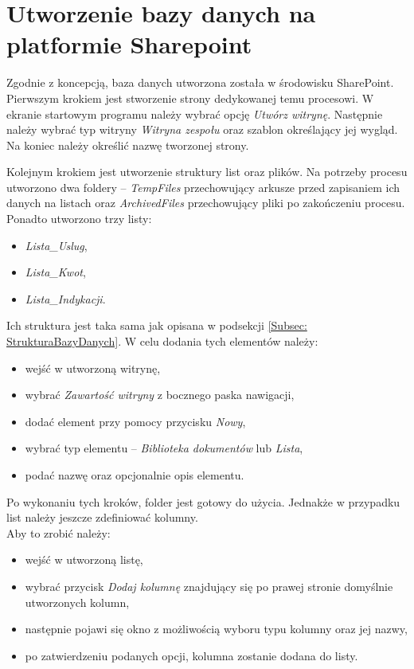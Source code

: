 \section{Utworzenie bazy danych na platformie Sharepoint}

Zgodnie z koncepcją, baza danych utworzona została w środowisku SharePoint.
Pierwszym krokiem jest stworzenie strony dedykowanej temu procesowi. W ekranie startowym programu należy wybrać opcję \emph{Utwórz witrynę}. Następnie należy wybrać typ witryny \emph{Witryna zespołu} oraz szablon określający jej wygląd. Na koniec należy określić nazwę tworzonej strony.

Kolejnym krokiem jest utworzenie struktury list oraz plików. Na potrzeby procesu utworzono dwa foldery -- \emph{TempFiles} przechowujący arkusze przed zapisaniem ich danych na listach oraz \emph{ArchivedFiles} przechowujący pliki po zakończeniu procesu.
Ponadto utworzono trzy listy:
\begin{itemize}
    \item \emph{Lista\_Uslug},
    \item \emph{Lista\_Kwot},
    \item \emph{Lista\_Indykacji}.
\end{itemize}
\hfill \break
Ich struktura jest taka sama jak opisana w podsekcji \ref{Subsec: StrukturaBazyDanych}. 
W celu dodania tych elementów należy:
\begin{itemize}
    \item wejść w utworzoną witrynę,
    \item wybrać \emph{Zawartość witryny} z bocznego paska nawigacji,
    \item dodać element przy pomocy przycisku \emph{Nowy},
    \item wybrać typ elementu -- \emph{Biblioteka dokumentów} lub \emph{Lista},
    \item podać nazwę oraz opcjonalnie opis elementu.
\end{itemize}

Po wykonaniu tych kroków, folder jest gotowy do użycia. Jednakże w przypadku list należy jeszcze zdefiniować kolumny. \\Aby to zrobić należy:
\begin{itemize}
    \item wejść w utworzoną listę,
    \item wybrać przycisk \emph{Dodaj kolumnę} znajdujący się po prawej stronie domyślnie utworzonych kolumn,
    \item następnie pojawi się okno z możliwością wyboru typu kolumny oraz jej nazwy,
    \item po zatwierdzeniu podanych opcji, kolumna zostanie dodana do listy.
\end{itemize}


